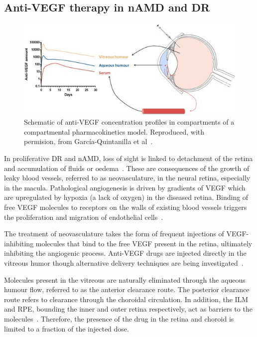 \documentclass{article}
\begin{document}
\subsection{Anti-VEGF therapy in nAMD and DR}\label{sec:Anti-VEGF}

\begin{figure}[t!]
  \centering
  \includegraphics{AntiVEGF}
  \caption{Schematic of anti-VEGF concentration profiles in compartments of a compartmental pharmacokinetics model. Reproduced, with permision, from Garc\'ia-Quintanilla et al~\cite{GarciaQuintanilla_2019}.}
  \label{fig:AntiVEGF}
\end{figure}

In proliferative DR and nAMD, loss of sight is linked to detachment of the retina and accumulation of fluids or oedema~\cite{Roberts_2020, Waldstein_2016}.
These are consequences of the growth of leaky blood vessels, referred to as neovasculature, in the neural retina, especially in the macula.
Pathological angiogenesis is driven by gradients of VEGF which are upregulated by hypoxia (a lack of oxygen) in the diseased retina.
Binding of free VEGF molecules to receptors on the walls of existing blood vessels triggers the proliferation and migration of endothelial cells~\cite{Ferrara_2004}.

The treatment of neovasculature takes the form of frequent injections of VEGF-inhibiting molecules that bind to the free VEGF present in the retina, ultimately inhibiting the angiogenic process.
Anti-VEGF drugs are injected directly in the vitreous humor though alternative delivery techniques are being investigated~\cite{Kim_2021}.

Molecules present in the vitreous are naturally eliminated through the aqueous humour flow, referred to as the anterior clearance route.
The posterior clearance route refers to clearance through the choroidal circulation.
In addition, the ILM and RPE, bounding the inner and outer retina respectively, act as barriers to the molecules~\cite{Park_2015}.
Therefore, the presence of the drug in the retina and choroid is limited to a fraction of the injected dose. 
\end{document}
